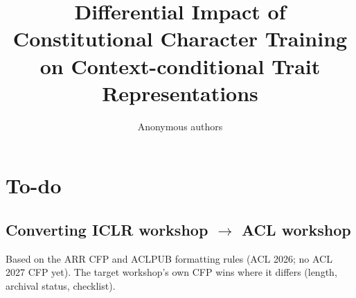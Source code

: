 \documentclass{article}
\title{Differential Impact of Constitutional Character Training on Context-conditional Trait Representations}
\author{Anonymous authors}
\begin{document}
\newif\iftodos
\todostrue
\iftodos
\thispagestyle{empty}
\section*{To-do}

\subsection*{Converting ICLR workshop $\rightarrow$ ACL workshop}
Based on the ARR CFP and ACLPUB formatting rules (ACL 2026; no ACL 2027 CFP yet). The target workshop's own CFP wins where it differs (length, archival status, checklist).
\end{document}
